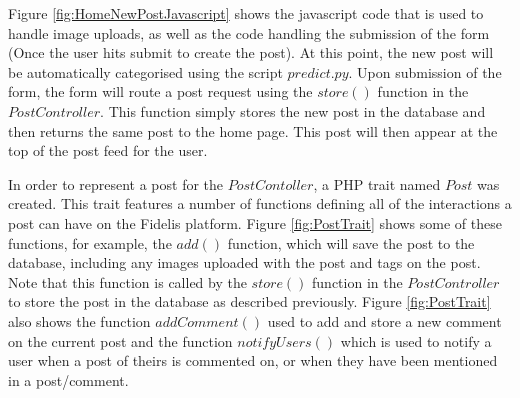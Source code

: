 Figure \ref{fig:HomeNewPostJavascript} shows the javascript code that is used to handle image uploads, as well as the code handling the submission of the form (Once the user hits submit to create the post). At this point, the new post will be automatically categorised using the script $predict.py$. Upon submission of the form, the form will route a post request using the $store()$ function in the $PostController$. This function simply stores the new post in the database and then returns the same post to the home page. This post will then appear at the top of the post feed for the user.

In order to represent a post for the $PostContoller$, a PHP trait named $Post$ was created. This trait features a number of functions defining all of the interactions a post can have on the Fidelis platform. Figure \ref{fig:PostTrait} shows some of these functions, for example, the $add()$ function, which will save the post to the database, including any images uploaded with the post and tags on the post. Note that this function is called by the $store()$ function in the $PostController$ to store the post in the database as described previously. Figure \ref{fig:PostTrait} also shows the function $addComment()$ used to add and store a new comment on the current post and the function $notifyUsers()$ which is used to notify a user when a post of theirs is commented on, or when they have been mentioned in a post/comment.

